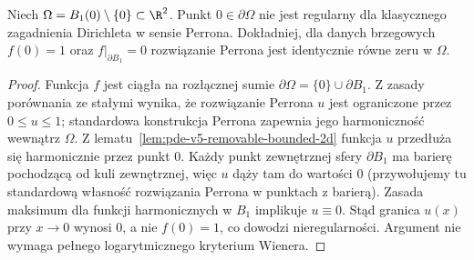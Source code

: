 \begin{stwierdzenie}
\label{prop:pde-v5-punctured-disk}
Niech $\Omega=B_1(0)\setminus\{0\}\subset\R^2$.
Punkt $0\in\partial\Omega$ nie jest regularny dla
klasycznego zagadnienia Dirichleta w sensie Perrona.
Dokładniej, dla danych brzegowych
$f(0)=1$ oraz $f|_{\partial B_1}=0$ rozwiązanie
Perrona jest identycznie równe zeru w $\Omega$.
\end{stwierdzenie}
\begin{proof}
Funkcja $f$ jest ciągła na rozłącznej sumie
$\partial\Omega=\{0\}\cup\partial B_1$.
Z zasady porównania ze stałymi wynika, że rozwiązanie
Perrona $u$ jest ograniczone przez $0\le u\le1$;
standardowa konstrukcja Perrona zapewnia jego harmoniczność
wewnątrz $\Omega$.
Z lematu~\ref{lem:pde-v5-removable-bounded-2d} funkcja $u$
przedłuża się harmonicznie przez punkt $0$. Każdy punkt
zewnętrznej sfery $\partial B_1$ ma barierę pochodzącą
od kuli zewnętrznej, więc $u$ dąży tam do wartości $0$
(przywołujemy tu standardową własność rozwiązania Perrona
w punktach z barierą).
Zasada maksimum dla funkcji harmonicznych w $B_1$
implikuje $u\equiv0$. Stąd granica $u(x)$ przy $x\to0$
wynosi $0$, a nie $f(0)=1$, co dowodzi nieregularności.
Argument nie wymaga pełnego logarytmicznego kryterium Wienera.
\end{proof}

